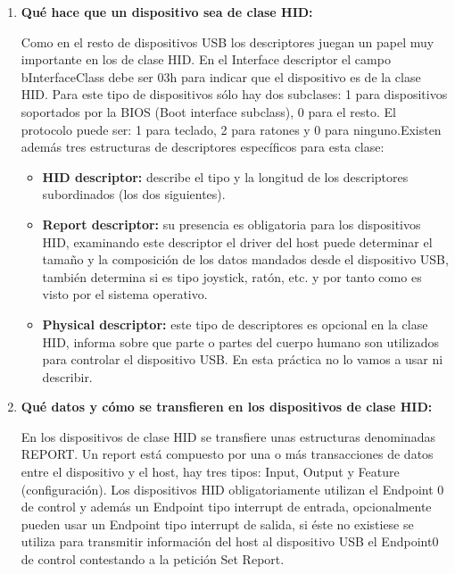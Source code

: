 \documentclass[a4paper, 11pt]{article}
\begin{document}
\begin{enumerate}
    \item \textbf{Qué hace que un dispositivo sea de clase HID:}

        Como en el resto de dispositivos USB los descriptores juegan un papel
        muy importante en los de clase HID. En el Interface descriptor el campo
        bInterfaceClass debe ser 03h para indicar que el dispositivo es de la
        clase HID. Para este tipo de dispositivos sólo hay dos subclases: 1
        para dispositivos soportados por la BIOS (Boot interface subclass), 0
        para el resto. El protocolo puede ser: 1 para teclado, 2 para ratones y
        0 para ninguno.Existen además tres estructuras de descriptores
        específicos para esta clase:
        \begin{itemize}
            \item \textbf{HID descriptor:} describe el tipo y la longitud de
                los descriptores subordinados (los dos siguientes).

            \item \textbf{Report descriptor:} su presencia es obligatoria para
                los dispositivos HID, examinando este descriptor el driver del
                host puede determinar el tamaño y la composición de los datos
                mandados desde el dispositivo USB, también determina si es tipo
                joystick, ratón, etc. y por tanto como es visto por el sistema
                operativo.

            \item \textbf{Physical descriptor:} este tipo de descriptores es
                opcional en la clase HID, informa sobre que parte o partes del
                cuerpo humano son utilizados para controlar el dispositivo USB.
                En esta práctica no lo vamos a usar ni describir.
        \end{itemize}

    \item \textbf{Qué datos y cómo se transfieren en los dispositivos de
        clase HID:}

        En los dispositivos de clase HID se transfiere unas estructuras
        denominadas REPORT. Un report está compuesto por una o más
        transacciones de datos entre el dispositivo y el host, hay tres tipos:
        Input, Output y Feature (configuración). Los dispositivos HID
        obligatoriamente utilizan el Endpoint 0 de control y además un Endpoint
        tipo interrupt de entrada, opcionalmente pueden usar un Endpoint tipo
        interrupt de salida, si éste no existiese se utiliza para transmitir
        información del host al dispositivo USB el Endpoint0 de control
        contestando a la petición Set Report.


\end{enumerate}
\end{document}
